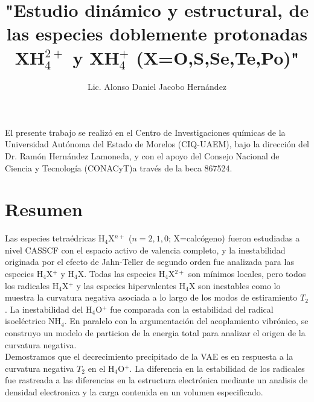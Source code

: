 \documentclass[12pt]{report}
\title{"Estudio dinámico y estructural, de las especies doblemente protonadas XH$_4^{2+}$ y XH$_4^+$ (X=O,S,Se,Te,Po)"}
\author{\large{Lic. Alonso Daniel Jacobo Hernández}}
\begin{document}
\vspace*{\fill}
El presente trabajo se realizó en el Centro de Investigaciones químicas de la Universidad Autónoma del Estado de Morelos (CIQ-UAEM), bajo la dirección del Dr. Ramón Hernández Lamoneda, y con el apoyo del Consejo Nacional de Ciencia y Tecnología (CONACyT)a través de la beca 867524.

\newpage

\tableofcontents
\newpage
\listoffigures
\newpage
\listoftables
\newpage
{}
\chapter*{Resumen}
Las especies tetraédricas H$_4$X${^{n+}}$ ($n=2, 1, 0$; X=calcógeno) fueron estudiadas a nivel CASSCF con el espacio activo de valencia completo, y la inestabilidad originada por el efecto de Jahn-Teller de segundo orden fue analizada para las especies H$_4$X${^{+}}$ y H$_4$X. Todas las especies H$_4$X$^{2+}$ son mínimos locales, pero todos los radicales H$_4$X$^+$ y las especies hipervalentes H$_4$X son inestables como lo muestra la curvatura negativa asociada a lo largo de los modos de estiramiento $T_2$. La inestabilidad del H$_4$O$^+$ fue comparada con la estabilidad del radical isoeléctrico NH$_4$. En paralelo con la argumentación del acoplamiento vibrónico, se construyo un modelo de particion de la energia total para analizar el origen de la curvatura negativa.
\\


Demostramos que el decrecimiento precipitado de la VAE es en respuesta a la curvatura negativa $T_2$ en el H$_4$O$^+$. La diferencia en la estabilidad de los radicales fue rastreada a las diferencias en la estructura electrónica mediante un analisis de densidad electronica y la carga contenida en un volumen especificado.

\newpage
\end{document}
